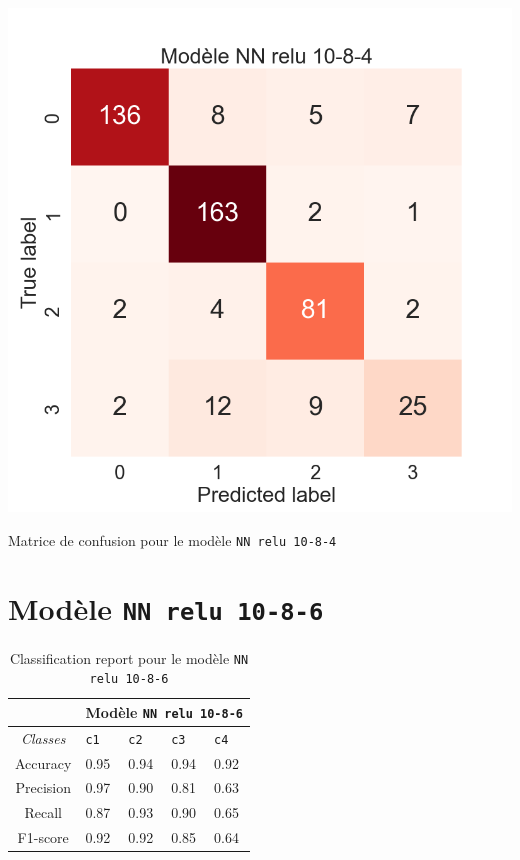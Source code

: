 \begin{table}[H]
    \includegraphics[scale=0.5]{images/y_pred_NN_relu_10-8-4.png}
    \caption{\label{HomePage} Matrice de confusion pour le modèle \texttt{NN relu 10-8-4}}
\end{table}

\newpage

\section{Modèle \texttt{NN relu 10-8-6}}

\begin{table}[ht]
  \begin{tabular}{ m{5em} | m{1cm}| m{1cm} | m{1cm}| m{1cm} | } 
  \cline{2-5}
             & \multicolumn{4}{|c|}{Modèle \texttt{NN relu 10-8-6}}\\
 \hline
 \multicolumn{1}{|c|}{\textit{Classes}} & \hfil \texttt{c1} & \hfil \texttt{c2} & \hfil \texttt{c3} & \hfil \texttt{c4} \\ 
  \hline
  \multicolumn{1}{|c|}{Accuracy} & \hfil 0.95 & \hfil 0.94 & \hfil 0.94 & \hfil 0.92 \\ 
  \hline
  \multicolumn{1}{|c|}{Precision} & \hfil 0.97 & \hfil 0.90 & \hfil 0.81 & \hfil 0.63 \\ 
  \hline
  \multicolumn{1}{|c|}{Recall} & \hfil 0.87 & \hfil 0.93 & \hfil 0.90 & \hfil 0.65 \\ 
  \hline
  \multicolumn{1}{|c|}{F1-score} & \hfil 0.92 & \hfil 0.92 & \hfil 0.85 & \hfil 0.64 \\ 
  \hline
\end{tabular}
\caption{Classification report pour le modèle \texttt{NN relu 10-8-6}}
  \label{Tab:Tcr}
\end{table}

